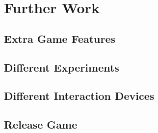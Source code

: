\chapter{Further Work}
\section{Extra Game Features}
\section{Different Experiments}
\section{Different Interaction Devices}
\section{Release Game}
